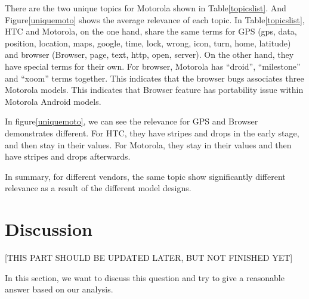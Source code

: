 \documentclass[10pt, conference, compsocconf]{IEEEtran}
\begin{document}
There are the two unique topics for Motorola shown in Table\ref{topicslist}. And Figure\ref{uniquemoto} shows the average relevance of each topic.
In Table\ref{topicslist}, HTC and Motorola, on the one hand, share the same terms for GPS (gps, data, position, location, maps, google, time, lock, wrong, icon, turn, home, latitude) and browser (Browser, page, text, http, open, server). On the other hand, they have special terms for their own. For browser, Motorola has “droid”, “milestone” and “xoom” terms together. This indicates that the browser bugs associates three Motorola models. This indicates that Browser feature has portability issue within Motorola Android models.

In figure\ref{uniquemoto}, we can see the relevance for GPS and Browser demonstrates different. For HTC, they have stripes and drops in the early stage, and then stay in their values. For Motorola, they stay in their values and then have stripes and drops afterwards.


In summary, for different vendors, the same topic show significantly different relevance as a result of the different model designs.


\section{Discussion}

[THIS PART SHOULD BE UPDATED LATER, BUT NOT FINISHED YET]

In this section, we want to discuss this question and try to give a reasonable answer based on our analysis.
\end{document}
